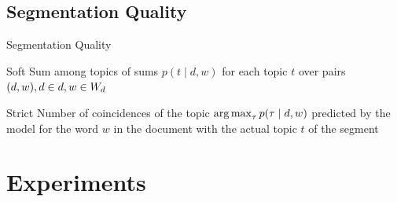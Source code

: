 \documentclass[russian]{beamer}
\begin{document}
	
\subsection{Segmentation Quality}


\begin{frame}{Segmentation Quality}
  \begin{block}{Soft}
    Sum among topics of sums $p(t \mid d, w)$ for each topic $t$ over pairs $(d, w), d \hm\in d, w \hm\in W_d$
  \end{block}
  
  \begin{block}{Strict}
    Number of coincidences of the topic $\operatorname*{arg\,max}_\tau p(\tau \mid d, w)$ predicted by the model for the word $w$ in the document with the actual topic $t$ of the segment
  \end{block}
\end{frame}


\section{Experiments}
\end{document}
